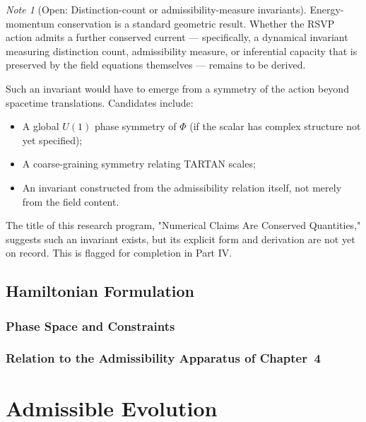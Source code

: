 \documentclass[12pt,a4paper,twoside,openright]{book}
\theoremstyle{plain}
\theoremstyle{definition}
\theoremstyle{remark}
\newtheorem{note}[theorem]{Note}
\newcommand{\Phifield}{\Phi}
\begin{document}
\begin{note}[Open: Distinction-count or admissibility-measure invariants]
Energy-momentum conservation is a standard geometric result. Whether the RSVP action admits a further conserved current — specifically, a dynamical invariant measuring distinction count, admissibility measure, or inferential capacity that is preserved by the field equations themselves — remains to be derived. 

Such an invariant would have to emerge from a symmetry of the action beyond spacetime translations. Candidates include:
\begin{itemize}
\item A global $U(1)$ phase symmetry of $\Phifield$ (if the scalar has complex structure not yet specified);
\item A coarse-graining symmetry relating TARTAN scales;
\item An invariant constructed from the admissibility relation itself, not merely from the field content.
\end{itemize}

The title of this research program, "Numerical Claims Are Conserved Quantities," suggests such an invariant exists, but its explicit form and derivation are not yet on record. This is flagged for completion in Part IV.
\end{note}

\section{Hamiltonian Formulation}

\subsection{Phase Space and Constraints}
\subsection{Relation to the Admissibility Apparatus of Chapter~4}


\chapter{Admissible Evolution}
\label{ch:admissible-evolution}

\end{document}
